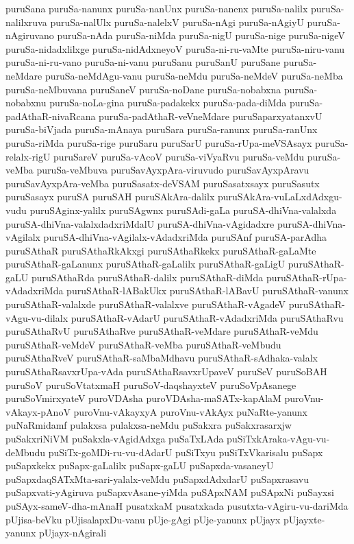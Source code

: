 {puruSana
puruSa-nanunx
puruSa-nanUnx
puruSa-nanenx
puruSa-nalilx
puruSa-nalilxruva
puruSa-nalUlx
puruSa-nalelxV
puruSa-nAgi
puruSa-nAgiyU
puruSa-nAgiruvano
puruSa-nAda
puruSa-niMda
puruSa-nigU
puruSa-nige
puruSa-nigeV
puruSa-nidadxlilxge
puruSa-nidAdxneyoV
puruSa-ni-ru-vaMte
puruSa-niru-vanu
puruSa-ni-ru-vano
puruSa-ni-vanu
puruSanu
puruSanU
puruSane
puruSa-neMdare
puruSa-neMdAgu-vanu
puruSa-neMdu
puruSa-neMdeV
puruSa-neMba
puruSa-neMbuvana
puruSaneV
puruSa-noDane
puruSa-nobabxna
puruSa-nobabxnu
puruSa-noLa-gina
puruSa-padakekx
puruSa-pada-diMda
puruSa-padAthaR-nivaRcana
puruSa-padAthaR-veVneMdare
puruSaparxyatanxvU
puruSa-biVjada
puruSa-mAnaya
puruSara
puruSa-ranunx
puruSa-ranUnx
puruSa-riMda
puruSa-rige
puruSaru
puruSarU
puruSa-rUpa-meVSAsayx
puruSa-relalx-rigU
puruSareV
puruSa-vAcoV
puruSa-viVyaRvu
puruSa-veMdu
puruSa-veMba
puruSa-veMbuva
puruSavAyxpAra-viruvudo
puruSavAyxpAravu
puruSavAyxpAra-veMba
puruSasatx-deVSAM
puruSasatxsayx
puruSasutx
puruSasayx
puruSA
puruSAH
puruSAkAra-dalilx
puruSAkAra-vuLaLxdAdxgu-vudu
puruSAginx-yalilx
puruSAgwnx
puruSAdi-gaLa
puruSA-dhiVna-valalxda
puruSA-dhiVna-valalxdadxriMdalU
puruSA-dhiVna-vAgidadxre
puruSA-dhiVna-vAgilalx
puruSA-dhiVna-vAgilalx-vAdadxriMda
puruSAnf
puruSA-parAdha
puruSAthaR
puruSAthaRkAkxgi
puruSAthaRkekx
puruSAthaR-gaLaMte
puruSAthaR-gaLanunx
puruSAthaR-gaLalilx
puruSAthaR-gaLigU
puruSAthaR-gaLU
puruSAthaRda
puruSAthaR-dalilx
puruSAthaR-diMda
puruSAthaR-rUpa-vAdadxriMda
puruSAthaR-lABakUkx
puruSAthaR-lABavU
puruSAthaR-vanunx
puruSAthaR-valalxde
puruSAthaR-valalxve
puruSAthaR-vAgadeV
puruSAthaR-vAgu-vu-dilalx
puruSAthaR-vAdarU
puruSAthaR-vAdadxriMda
puruSAthaRvu
puruSAthaRvU
puruSAthaRve
puruSAthaR-veMdare
puruSAthaR-veMdu
puruSAthaR-veMdeV
puruSAthaR-veMba
puruSAthaR-veMbudu
puruSAthaRveV
puruSAthaR-saMbaMdhavu
puruSAthaR-sAdhaka-valalx
puruSAthaRsavxrUpa-vAda
puruSAthaRsavxrUpaveV
puruSeV
puruSoBAH
puruSoV
puruSoVtatxmaH
puruSoV-daqshayxteV
puruSoVpAsanege
puruSoVmirxyateV
puroVDAsha
puroVDAsha-maSATx-kapAlaM
puroVnu-vAkayx-pAnoV
puroVnu-vAkayxyA
puroVnu-vAkAyx
puNaRte-yanunx
puNaRmidamf
pulakxsa
pulakxsa-neMdu
puSakxra
puSakxrasarxjw
puSakxriNiVM
puSakxla-vAgidAdxga
puSaTxLAda
puSiTxkAraka-vAgu-vu-deMbudu
puSiTx-goMDi-ru-vu-dAdarU
puSiTxyu
puSiTxVkarisalu
puSapx
puSapxkekx
puSapx-gaLalilx
puSapx-gaLU
puSapxda-vasaneyU
puSapxdaqSATxMta-sari-yalalx-veMdu
puSapxdAdxdarU
puSapxrasavu
puSapxvati-yAgiruva
puSapxvAsane-yiMda
puSApxNAM
puSApxNi
puSayxsi
puSAyx-sameV-dha-mAnaH
pusatxkaM
pusatxkada
pusutxta-vAgiru-vu-dariMda
pUjisa-beVku
pUjisalapxDu-vanu
pUje-gAgi
pUje-yanunx
pUjayx
pUjayxte-yanunx
pUjayx-nAgirali
}

